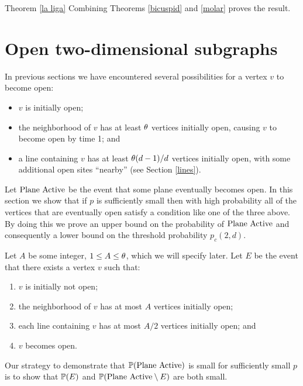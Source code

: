 \begin{pfofthm}{Theorem \ref{la liga}}
Combining Theorems \ref{bicuspid} and \ref{molar} proves the result. 
\end{pfofthm}


\section{Open two-dimensional subgraphs} \label{nessforplanes}
In previous sections we have encountered several possibilities
for a vertex $v$ to become open:
\begin{itemize}
\item $v$ is initially open;
\item the neighborhood of $v$ has at least $\theta$ vertices initially open, causing $v$ to become open by time 1; and 
\item a line containing $v$ has at least $\theta(d-1)/d$ vertices initially open, 
with some additional open sites ``nearby'' (see Section 
\ref{lines}).
\end{itemize}

Let $\text{Plane Active}$ be the event that some plane eventually becomes open.
In this section we show that if $p$ is sufficiently small then with high probability all of the vertices that are eventually open satisfy a condition like one of the three above.
By doing this we prove an upper bound on the 
probability of $\text{Plane Active}$ and consequently a lower bound on the threshold probability $p_c(2,d)$.  


Let $A$ be some integer, $1\leq A\leq \theta$, which we will specify later. Let $E$ be the event that there exists a vertex $v$ such that:
\begin{enumerate}
\item $v$ is initially not open; \label{aretha}
\item the neighborhood of $v$ has at most $A$ vertices initially open; \label{thebigo}
\item each line containing $v$ has at most $A/2$ vertices initially open; and \label{wilsonpickett}
\item $v$ becomes open. \label{samcooke}
\end{enumerate}
Our strategy to demonstrate that $\mathbb{P}(\text{Plane Active})$ is small for sufficiently small $p$ is to  
show that  $\mathbb{P}(E)$ and $\mathbb{P}(\text{Plane Active} \setminus E)$ are both small.


